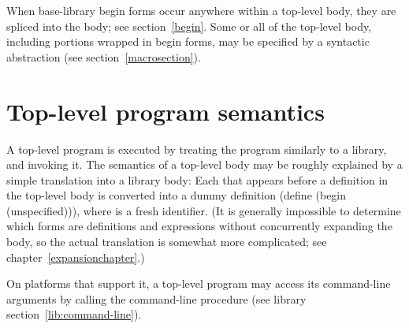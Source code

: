 When base-library {\cf begin} forms occur anywhere within a top-level body,
they are spliced into the body; see section~\ref{begin}.
Some or all of the top-level body, including portions wrapped in {\cf begin}
forms, may be specified by a syntactic abstraction
(see section~\ref{macrosection}).

\section{Top-level program semantics}

A top-level program is executed by treating the program similarly to a library, and
invoking it.  The semantics of a top-level body may be roughly explained by
a simple translation into a library body: 
Each  that appears before a
definition in
the top-level body is converted into a dummy definition 
{\cf (define  (begin  (unspecified)))},
where  is a fresh identifier.
(It is generally impossible to determine which forms are 
definitions and expressions without concurrently expanding the body, so
the actual translation is somewhat more complicated; see
chapter~\ref{expansionchapter}.)

On platforms that support it, a top-level program may access its command-line 
arguments by calling the {\cf command-line} procedure (see library 
section~\ref{lib:command-line}).


